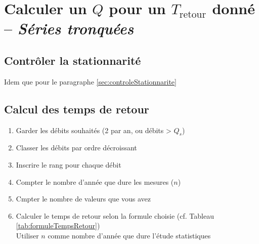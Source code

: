 \chapter{Calculer un $Q$ pour un $T_\text{retour}$ donné -- \textit{Séries tronquées}}



\section{Contrôler la stationnarité}
Idem que pour le paragraphe \ref{sec:controleStationnarite}

\section{Calcul des temps de retour} \label{sec:tempsRetourTronquee}
\begin{enumerate}
    \item Garder les débits souhaités (2 par an, ou débits > $Q_s$)
    \item Classer les débits par ordre décroissant
    \item Inscrire le rang pour chaque débit
    \item Compter le nombre d'année que dure les mesures ($n$)
    \item Cmpter le nombre de valeurs que vous avez
    \item Calculer le temps de retour selon la formule choisie (cf. Tableau \ref{tab:formuleTempsRetour}) \\
    Utiliser $n$ comme nombre d'année que dure l'étude statistiques
\end{enumerate}


